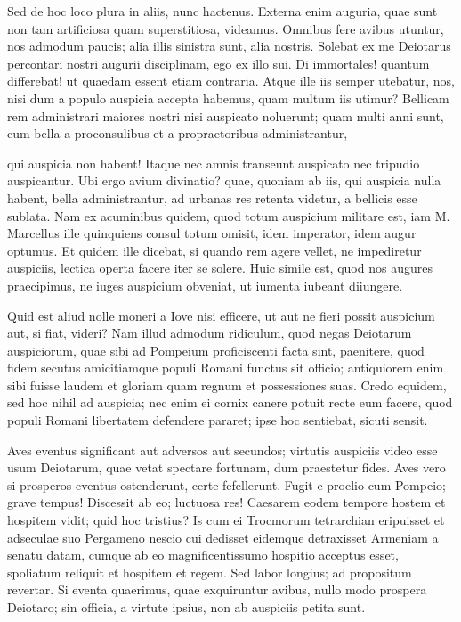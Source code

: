  Sed de hoc loco plura in aliis, nunc hactenus. Externa enim auguria, quae sunt non tam artificiosa quam superstitiosa, videamus. Omnibus fere avibus utuntur, nos admodum paucis; alia illis sinistra sunt, alia nostris. Solebat ex me Deiotarus percontari nostri augurii disciplinam, ego ex illo sui. Di immortales! quantum differebat! ut quaedam essent etiam contraria. Atque ille iis semper utebatur, nos, nisi dum a populo auspicia accepta habemus, quam multum iis utimur? Bellicam rem administrari maiores nostri nisi auspicato noluerunt; quam multi anni sunt, cum bella a proconsulibus et a propraetoribus administrantur,

 qui auspicia non habent! Itaque nec amnis transeunt auspicato nec tripudio auspicantur. Ubi ergo avium divinatio? quae, quoniam ab iis, qui auspicia nulla habent, bella administrantur, ad urbanas res retenta videtur, a bellicis esse sublata. Nam ex acuminibus quidem, quod totum auspicium militare est, iam M. Marcellus ille quinquiens consul totum omisit, idem imperator, idem augur optumus. Et quidem ille dicebat, si quando rem agere vellet, ne impediretur auspiciis, lectica operta facere iter se solere. Huic simile est, quod nos augures praecipimus, ne iuges auspicium obveniat, ut iumenta iubeant diiungere.

 Quid est aliud nolle moneri a Iove nisi efficere, ut aut ne fieri possit auspicium aut, si fiat, videri? Nam illud admodum ridiculum, quod negas Deiotarum auspiciorum, quae sibi ad Pompeium proficiscenti facta sint, paenitere, quod fidem secutus amicitiamque populi Romani functus sit officio; antiquiorem enim sibi fuisse laudem et gloriam quam regnum et possessiones suas. Credo equidem, sed hoc nihil ad auspicia; nec enim ei cornix canere potuit recte eum facere, quod populi Romani libertatem defendere pararet; ipse hoc sentiebat, sicuti sensit.

 Aves eventus significant aut adversos aut secundos; virtutis auspiciis video esse usum Deiotarum, quae vetat spectare fortunam, dum praestetur fides. Aves vero si prosperos eventus ostenderunt, certe fefellerunt. Fugit e proelio cum Pompeio; grave tempus! Discessit ab eo; luctuosa res! Caesarem eodem tempore hostem et hospitem vidit; quid hoc tristius? Is cum ei Trocmorum tetrarchian eripuisset et adseculae suo Pergameno nescio cui dedisset eidemque detraxisset Armeniam a senatu datam, cumque ab eo magnificentissumo hospitio acceptus esset, spoliatum reliquit et hospitem et regem. Sed labor longius; ad propositum revertar. Si eventa quaerimus, quae exquiruntur avibus, nullo modo prospera Deiotaro; sin officia, a virtute ipsius, non ab auspiciis petita sunt.

